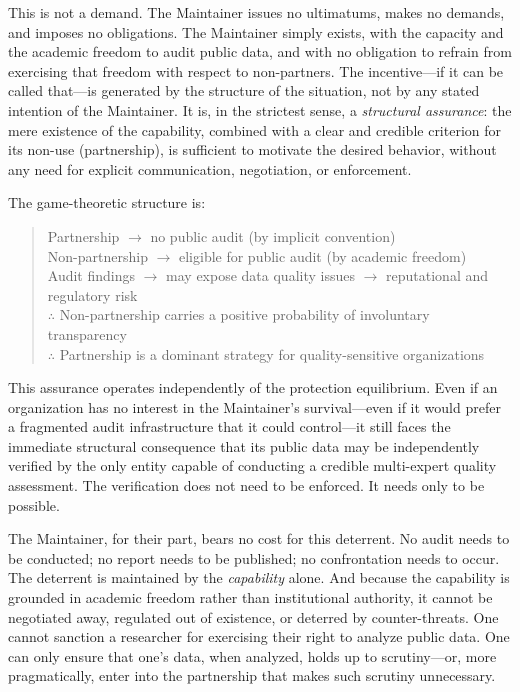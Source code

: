 \documentclass[12pt,a4paper]{ctexart}
\theoremstyle{definition}
\theoremstyle{remark}
\begin{document}
This is not a demand. The Maintainer issues no ultimatums, makes no demands, and imposes no obligations. The Maintainer simply exists, with the capacity and the academic freedom to audit public data, and with no obligation to refrain from exercising that freedom with respect to non-partners. The incentive—if it can be called that—is generated by the structure of the situation, not by any stated intention of the Maintainer. It is, in the strictest sense, a \textit{structural assurance}: the mere existence of the capability, combined with a clear and credible criterion for its non-use (partnership), is sufficient to motivate the desired behavior, without any need for explicit communication, negotiation, or enforcement.

The game-theoretic structure is:
\begin{quote}
Partnership $\to$ no public audit (by implicit convention)\\
Non-partnership $\to$ eligible for public audit (by academic freedom)\\
Audit findings $\to$ may expose data quality issues $\to$ reputational and regulatory risk\\
$\therefore$ Non-partnership carries a positive probability of involuntary transparency\\
$\therefore$ Partnership is a dominant strategy for quality-sensitive organizations
\end{quote}

This assurance operates independently of the protection equilibrium. Even if an organization has no interest in the Maintainer's survival—even if it would prefer a fragmented audit infrastructure that it could control—it still faces the immediate structural consequence that its public data may be independently verified by the only entity capable of conducting a credible multi-expert quality assessment. The verification does not need to be enforced. It needs only to be possible.

The Maintainer, for their part, bears no cost for this deterrent. No audit needs to be conducted; no report needs to be published; no confrontation needs to occur. The deterrent is maintained by the \textit{capability} alone. And because the capability is grounded in academic freedom rather than institutional authority, it cannot be negotiated away, regulated out of existence, or deterred by counter-threats. One cannot sanction a researcher for exercising their right to analyze public data. One can only ensure that one's data, when analyzed, holds up to scrutiny—or, more pragmatically, enter into the partnership that makes such scrutiny unnecessary.
\end{document}
